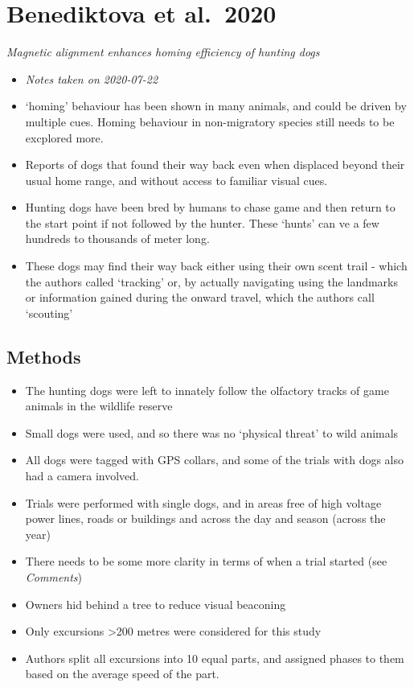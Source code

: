 \documentclass[
]{book}
\providecommand{\tightlist}{%
  \setlength{\itemsep}{0pt}\setlength{\parskip}{0pt}}
\begin{document}
\hypertarget{benediktovadogfield}{%
\chapter{Benediktova et al.~2020}\label{benediktovadogfield}}

\emph{Magnetic alignment enhances homing efficiency of hunting dogs} \citep{benediktova2020magnetic}

\begin{itemize}
\item
  \emph{Notes taken on 2020-07-22}
\item
  `homing' behaviour has been shown in many animals, and could be driven by multiple cues. Homing behaviour in non-migratory species still needs to be excplored more.
\item
  Reports of dogs that found their way back even when displaced beyond their usual home range, and without access to familiar visual cues.
\item
  Hunting dogs have been bred by humans to chase game and then return to the start point if not followed by the hunter. These `hunts' can ve a few hundreds to thousands of meter long.
\item
  These dogs may find their way back either using their own scent trail - which the authors called `tracking' or, by actually navigating using the landmarks or information gained during the onward travel, which the authors call `scouting'
\end{itemize}

\hypertarget{methods-3}{%
\section{Methods}\label{methods-3}}

\begin{itemize}
\tightlist
\item
  The hunting dogs were left to innately follow the olfactory tracks of game animals in the wildlife reserve
\item
  Small dogs were used, and so there was no `physical threat' to wild animals
\item
  All dogs were tagged with GPS collars, and some of the trials with dogs also had a camera involved.
\item
  Trials were performed with single dogs, and in areas free of high voltage power lines, roads or buildings and across the day and season (across the year)
\item
  There needs to be some more clarity in terms of when a trial started (see \emph{Comments})
\item
  Owners hid behind a tree to reduce visual beaconing
\item
  Only excursions \textgreater200 metres were considered for this study
\item
  Authors split all excursions into 10 equal parts, and assigned phases to them based on the average speed of the part.
\end{itemize}
\end{document}
